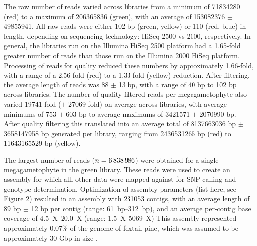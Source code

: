 \documentclass[11pt]{article}
\begin{document}
The raw number of reads varied across libraries from a minimum of
\num{71834280} (red) to a maximum of \num{206365836} (green), with an average of \num{153082376} 
$\pm$ \num{49855941}. All raw reads were either 102 bp (green, yellow) or 110 (red, blue) in length, 
depending on sequencing technology: HiSeq 2500 vs 2000, respectively. In 
general, the libraries run on the Illumina HiSeq 2500 platform had a \num{1.65}-fold greater 
number of reads than those run on the Illumina 2000 HiSeq platform. Processing of reads 
for quality reduced these numbers by approximately \num{1.66}-fold, with a range 
of a \num{2.56}-fold (red) to a \num{1.33}-fold (yellow) reduction. After filtering, the average
length of reads was 88 $\pm$ 13 bp, with a range of 40 bp to 102 bp across libraries. 
The number of quality-filtered reads per megagametophyte also varied \num{19741}-fold ($\pm$ \num{27069}-fold) 
on average across libraries, with average minimums of 753 $\pm$ 603 bp to average maximums of 
\num{3421571} $\pm$ \num{2070990} bp. After quality filtering this translated into an average total of 
\num{8137663036} bp $\pm$ \num{3658147958} bp generated per library, ranging from 
\num{2436531265} bp (red) to \num{11643165529} bp (yellow).  

The largest number of reads ($n=\text{\num{6838986}}$) were obtained for a single megagametophyte in the 
green library. These reads were used to create an assembly for which alll other data were mapped against 
for SNP calling and genotype determination. Optimization of assembly parameters (list here, see Figure 2) 
resulted in an assembly with \num{231053} contigs, with an average length of 89 bp $\pm$ 12 bp per contig 
(range: \SIrange {61}{312}{bp}), and an average per-contig base coverage of \SIrange{4.5}{20.0}{X} (range: 
\SIrange{1.5}{5069}{X})
This assembly represented approximately 0.07\% of the genome of foxtail
pine, which was assumed to be approximately 30 Gbp in size \citep{Murray:1998}.
\end{document}
